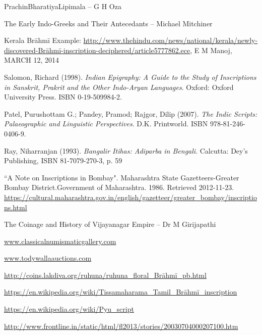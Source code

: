 \begin{thebibliography}{99}
 PrachinBharatiyaLipimala – G H Oza

  The Early Indo-Greeks and Their Antecedants – Michael Mitchiner

  Kerala Brāhmī Example: \url{http://www.thehindu.com/news/national/kerala/newly-discovered-Brāhmī-inscription-deciphered/article5777862.ece}, E M Manoj, MARCH 12, 2014

  Salomon, Richard (1998). \textit{Indian Epigraphy: A Guide to the Study of Inscriptions in Sanskrit, Prakrit and the Other Indo-Aryan Languages}. Oxford: Oxford University Press. ISBN 0-19-509984-2.

  Patel, Purushottam G.; Pandey, Pramod; Rajgor, Dilip (2007). \textit{The Indic Scripts: Palaeographic and Linguistic Perspectives}. D.K. Printworld. ISBN 978-81-246-0406-9.

  Ray, Niharranjan (1993). \textit{Bangalir Itihas: Adiparba in Bengali}. Calcutta: Dey's Publishing, ISBN 81-7079-270-3, p. 59

  “A Note on Inscriptions in Bombay". Maharashtra State Gazetteers-Greater Bombay District.Government of Maharashtra. 1986. Retrieved 2012-11-23. \url{https://cultural.maharashtra.gov.in/english/gazetteer/greater_bombay/inscriptions.html}

  The Coinage and History of Vijayanagar Empire – Dr M Girijapathi

  \url{www.classicalnumismaticgallery.com}

  \url{www.todywallaauctions.com}

  \url{http://coins.lakdiva.org/ruhuna/ruhuna_floral_Brāhmī_pb.html}

  \url{https://en.wikipedia.org/wiki/Tissamaharama_Tamil_Brāhmī_inscription}

  \url{https://en.wikipedia.org/wiki/Pyu_script}

  \url{http://www.frontline.in/static/html/fl2013/stories/20030704000207100.htm}

 \end{thebibliography}

